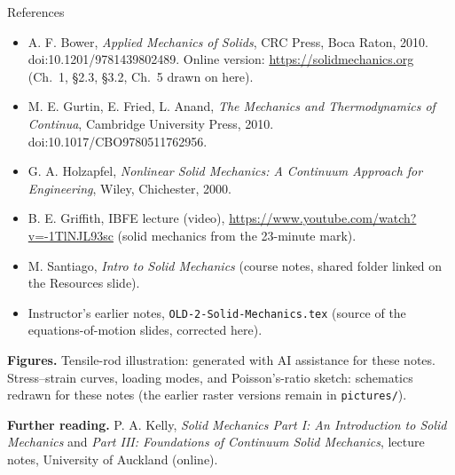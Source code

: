 \documentclass[aspectratio=169,11pt]{beamer}
\begin{document}
\begin{frame}{References}
  \scriptsize
  \begin{itemize}
    \item A. F. Bower, \emph{Applied Mechanics of Solids}, CRC Press, Boca Raton, 2010. doi:10.1201/9781439802489. Online version: \url{https://solidmechanics.org} (Ch.~1, \S2.3, \S3.2, Ch.~5 drawn on here).
    \item M. E. Gurtin, E. Fried, L. Anand, \emph{The Mechanics and Thermodynamics of Continua}, Cambridge University Press, 2010. doi:10.1017/CBO9780511762956.
    \item G. A. Holzapfel, \emph{Nonlinear Solid Mechanics: A Continuum Approach for Engineering}, Wiley, Chichester, 2000.
    \item B. E. Griffith, IBFE lecture (video), \url{https://www.youtube.com/watch?v=-1TlNJL93sc} (solid mechanics from the 23-minute mark).
    \item M. Santiago, \emph{Intro to Solid Mechanics} (course notes, shared folder linked on the Resources slide).
    \item Instructor's earlier notes, \texttt{OLD-2-Solid-Mechanics.tex} (source of the equations-of-motion slides, corrected here).
  \end{itemize}
  \medskip
  \textbf{Figures.} Tensile-rod illustration: generated with AI assistance for these notes. Stress--strain curves, loading modes, and Poisson's-ratio sketch: schematics redrawn for these notes (the earlier raster versions remain in \texttt{pictures/}).

  \medskip
  \textbf{Further reading.} P. A. Kelly, \emph{Solid Mechanics Part I: An Introduction to Solid Mechanics} and \emph{Part III: Foundations of Continuum Solid Mechanics}, lecture notes, University of Auckland (online).
\end{frame}
\end{document}

